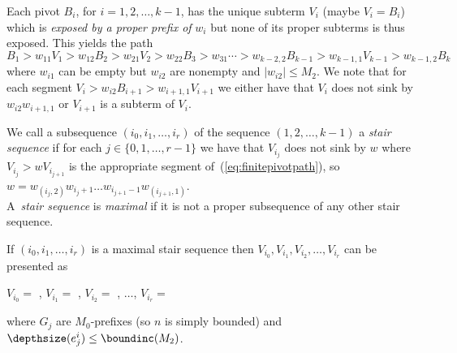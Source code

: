 \documentclass[12pt]{article}
\begin{document}
Each pivot $B_i$, for $i=1,2,\dots, k{-}1$,
has the unique subterm $V_i$ (maybe $V_i=B_i$)
which is \emph{exposed by a proper prefix of} 
$w_i$ but none of its 
proper subterms is thus exposed.
This yields the path 
\begin{equation}\label{eq:finitepivotpath}
B_1\gt{w_{11}}V_1\gt{w_{12}} B_2\gt{w_{21}}V_2
\gt{w_{22}}B_3\gt{w_{31}}
\cdots
\gt{w_{k-2,2}}B_{k-1}
\gt{w_{k-1,1}}V_{k-1}\gt{w_{k-1,2}} B_k
\end{equation}
where $w_{i1}$ can be empty but $w_{i2}$ are nonempty and 
 $|w_{i2}|\leq M_2$.
We note that 
for each segment $V_i\gt{w_{i2}} B_{i+1}\gt{w_{i+1,1}}V_{i+1}$
we either have that $V_i$ does not sink by 
${w_{i2}}{w_{i+1,1}}$ or $V_{i+1}$ is a subterm of $V_i$.


\begin{defn}
We call a subsequence $(i_0, i_1, \dots , i_r)$ of 
the sequence $(1,2,\dots,k{-}1)$ 
a \emph{stair sequence} 
if for each
$j\in\{0,1,\dots,r{-}1\}$
we have that 
$V_{i_j}$ does not sink by ${w}$ where 
$V_{i_j}\gt{w}V_{i_{j+1}}$ is the appropriate segment
of~(\ref{eq:finitepivotpath}), so $w=w_{(i_j,2)}w_{i_j+1}\dots
w_{i_{j+1}-1}w_{(i_{j+1},1)}$.
\\
A~\emph{stair sequence} is \emph{maximal} if 
it is not a proper subsequence of any other stair sequence.
\end{defn}

\begin{prop}\label{prop:stairpres}
If  $(i_0, i_1, \dots , i_r)$ is a maximal stair sequence then
$V_{i_0},V_{i_1},V_{i_2},\dots, V_{i_r}$ 
can be presented as

$V_{i_0}=$
,
$V_{i_1}=$
,
$V_{i_2}=$
,
$\dots$,
$V_{i_r}=$

\smallskip
\noindent
where $G_j$ are $M_0$-prefixes (so $n$ is simply bounded) and
$\depthsize(e^i_j)\leq \boundinc(M_2)$. 
\end{prop}
\end{document}
